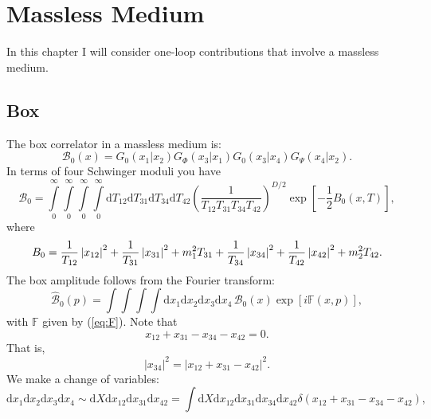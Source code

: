 \chapter{Massless Medium}
In this chapter I will consider one-loop contributions that involve a massless medium.
\section{Box}
The box correlator in a massless medium is:
\begin{equation}
	\mathcal{B}_{0}(x) = G_{0}(x_{1}| x_{2}) G_{\Phi}(x_{3}| x_{1}) G_{0}(x_{3}| x_{4}) G_{\Psi}(x_{4}| x_{2}).
	\label{eq:box_A}
\end{equation}
In terms of four Schwinger moduli you have
\begin{equation}
	\mathcal{B}_{0} = \int\limits_{0}^{\infty} \int\limits_{0}^{\infty} \int\limits_{0}^{\infty} \int\limits_{0}^{\infty} \mathrm{d}T_{12} \mathrm{d}T_{31} \mathrm{d}T_{34} \mathrm{d}T_{42} \left( \frac{1}{T_{12} T_{31} T_{34} T_{42}} \right)^{D/2} \exp{\left[- \frac{1}{2} B_{0}(x, T) \right]},
\end{equation}
where
\begin{equation}
	B_{0} = \frac{1}{T_{12}} \left\lvert x_{12} \right\rvert^{2} + \frac{1}{T_{31}} \left\lvert x_{31} \right\rvert^{2} + m_{1}^{2} T_{31} + \frac{1}{T_{34}} \left\lvert x_{34} \right\rvert^{2} + \frac{1}{T_{42}} \left\lvert x_{42} \right\rvert^{2} + m_{2}^{2} T_{42}.
\end{equation}
The box amplitude follows from the Fourier transform:
\begin{equation}
	\widehat{\mathcal{B}}_{0}(p) = \int \int \int \int \mathrm{d}x_{1} \mathrm{d}x_{2} \mathrm{d}x_{3} \mathrm{d}x_{4} \, \mathcal{B}_{0}(x) \exp{\left[ i \mathbb{F}(x, p) \right]},
\end{equation}
with $\mathbb{F}$ given by (\ref{eq:F}). Note that
\begin{equation}
	x_{12} + x_{31} - x_{34} - x_{42} = 0.
\end{equation}
That is,
\begin{equation}
	|x_{34}|^{2} = |x_{12} + x_{31} - x_{42}|^{2}.
\end{equation}
We make a change of variables:
\begin{equation}
	\mathrm{d}x_{1} \mathrm{d}x_{2} \mathrm{d}x_{3} \mathrm{d}x_{4} \sim \mathrm{d}X \mathrm{d}x_{12} \mathrm{d}x_{31} \mathrm{d}x_{42} = \int \mathrm{d}X \mathrm{d}x_{12} \mathrm{d}x_{31} \mathrm{d}x_{34} \mathrm{d}x_{42} \delta(x_{12} + x_{31} - x_{34} - x_{42}),
\end{equation}
